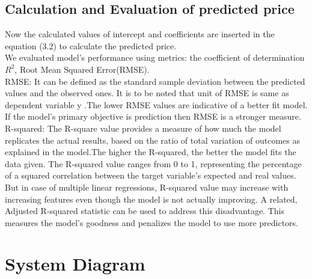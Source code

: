 \subsection{Calculation and Evaluation of predicted price}
\vspace{-18pt}
Now the calculated values of intercept and coefficients are inserted in the equation (3.2) to calculate the predicted price.\\
We evaluated model’s performance using metrics: the coefficient of determination $R^2$, Root Mean Squared Error(RMSE).\\
RMSE: It can be defined as the standard sample deviation between the predicted values and the observed ones. It is to be noted that unit of RMSE is same as dependent variable y .The lower RMSE values are indicative of a better fit model. If the model's primary objective is prediction then RMSE is a stronger measure.\\
R-squared: The R-square value provides a measure of how much the model replicates the actual results, based on the ratio of total variation of outcomes as explained in the model.The higher the R-squared, the better the model fits the data given. The R-squared value ranges from 0 to 1, representing the percentage of a squared correlation between the target variable's expected and real values. But in case of multiple linear regressions, R-squared value may increase with increasing features even though the model is not actually improving. A related, Adjusted R-squared statistic can be used to address this disadvantage. This measures the model's goodness and penalizes the model to use more predictors.
\section{System Diagram}
\vspace{-18pt}
